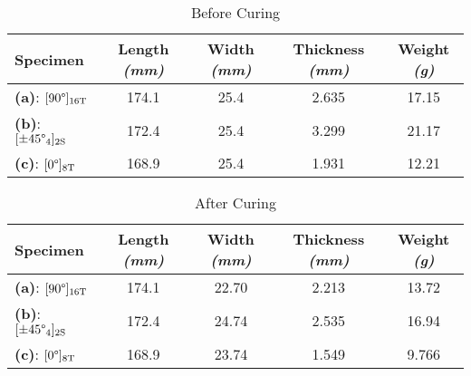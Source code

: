 \begin{table}[!h]
    \centering
    \caption{Before Curing}
    \begin{tabular}{|l||c|c|c|c|}\toprule
        Specimen & Length \textit{(mm)} & Width \textit{(mm)} & Thickness \textit{(mm)} & Weight \textit{(g)} \\ \midrule
        \textbf{(a)}: $[90\degree]_{16\text{T}}$ & 174.1 & 25.4 & 2.635 & 17.15 \\\hline
        \textbf{(b)}: $[\pm45\degree_4]_{2\text{S}}$ & 172.4 & 25.4 & 3.299 & 21.17 \\\hline
        \textbf{(c)}: $[0\degree]_{8\text{T}}$ & 168.9 & 25.4 & 1.931 & 12.21 \\\bottomrule
    \end{tabular}
    \label{tab:beforedimensions}
\end{table}
\begin{table}[!h]
    \centering
    \caption{After Curing}
    \begin{tabular}{|l||c|c|c|c|}\toprule
        Specimen & Length \textit{(mm)} & Width \textit{(mm)} & Thickness \textit{(mm)} & Weight \textit{(g)} \\ \midrule
        \textbf{(a)}: $[90\degree]_{16\text{T}}$ & 174.1 & 22.70 & 2.213 & 13.72 \\\hline
        \textbf{(b)}: $[\pm45\degree_4]_{2\text{S}}$ & 172.4 & 24.74 & 2.535 & 16.94 \\\hline
        \textbf{(c)}: $[0\degree]_{8\text{T}}$ & 168.9 & 23.74 & 1.549 & 9.766 \\\bottomrule
    \end{tabular}
    \label{tab:afterdimensions}
\end{table}

